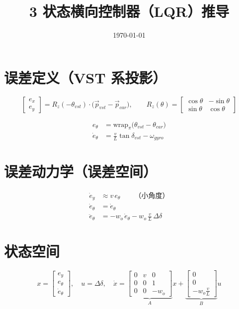 \documentclass[11pt,a4paper]{article}
\title{3 状态横向控制器（LQR）推导}
\author{}
\date{\today}
\begin{document}
\maketitle

\section{误差定义（VST 系投影）}

\begin{equation}
\begin{bmatrix}e_x\\ e_y\end{bmatrix}
= R_z(-\theta_{vst})\cdot\big(\vec p_{vst}-\vec p_{car}\big),
\qquad
R_z(\theta)=\begin{bmatrix}\cos\theta & -\sin\theta\\ \sin\theta & \cos\theta\end{bmatrix}
\end{equation}

\begin{align}
e_\theta &= \mathrm{wrap}_\pi\big(\theta_{vst}-\theta_{car}\big) \\
\dot e_\theta &= \frac{v}{L}\tan\delta_{vst} - \omega_{gyro}
\end{align}

\section{误差动力学（误差空间）}

\begin{align}
\dot e_y   &\approx v\,e_\theta \qquad \text{（小角度）} \\
\dot e_\theta &= \dot e_\theta \\
\ddot e_\theta &= -w_o\,\dot e_\theta - w_o\,\frac{v}{L}\,\Delta\delta
\end{align}

\section{状态空间}

\begin{equation}
x=\begin{bmatrix}e_y\\ e_\theta\\ \dot e_\theta\end{bmatrix},\quad u=\Delta\delta,\quad
\dot x =
\underbrace{\begin{bmatrix}
0 & v & 0\\
0 & 0 & 1\\
0 & 0 & -w_o
\end{bmatrix}}_{A}
x +
\underbrace{\begin{bmatrix}
0\\0\\-w_o\frac{v}{L}
\end{bmatrix}}_{B}
u
\end{equation}
\end{document}
